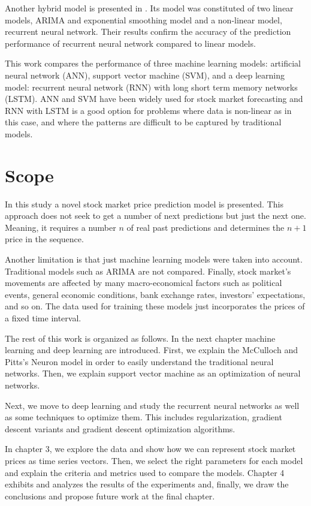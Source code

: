Another hybrid model is presented in \cite{rather2015recurrent}. Its model was constituted of two linear models,  ARIMA and exponential smoothing model and a non-linear model, recurrent neural network. Their results confirm the accuracy of the prediction performance of recurrent neural network compared to linear models.

This work compares the performance of three machine learning models: artificial neural network (ANN), support vector machine (SVM), and a deep learning model: recurrent neural network (RNN) with long short term memory networks (LSTM). ANN and SVM have been widely used for stock market forecasting and RNN with LSTM is a good option for problems where data is non-linear  as in this case, and where the patterns are difficult to be captured by traditional models.

\section{Scope}
In this study a novel stock market price prediction model is presented. This approach does not seek to get a number of next predictions but just the next one. Meaning, it requires a number $n$ of real past predictions and determines the $n+1$ price in the sequence. 

Another limitation is that just machine learning models were taken into account. Traditional models such as ARIMA are not compared. Finally, stock market’s movements are affected by many macro-economical factors such as political events, general economic conditions, bank exchange rates, investors’ expectations, and so on. The data used for training these models just incorporates the prices of a fixed time interval.

The rest of this work is organized as follows. In the next chapter machine learning and deep learning are introduced. First, we explain the McCulloch and Pitts's Neuron model in order to easily understand the traditional neural networks. Then, we explain support vector machine as an optimization of neural networks.

Next, we move to deep learning and study the recurrent neural networks as well as some techniques to optimize them. This includes regularization, gradient descent variants and gradient descent optimization algorithms.  

In  chapter 3, we explore the data and show how we can represent stock market prices as time series vectors. Then, we select the right parameters for each model and explain the criteria and metrics used to compare the models. Chapter 4 exhibits and analyzes  the results of the experiments and, finally, we draw the conclusions and propose future work at the final chapter.

